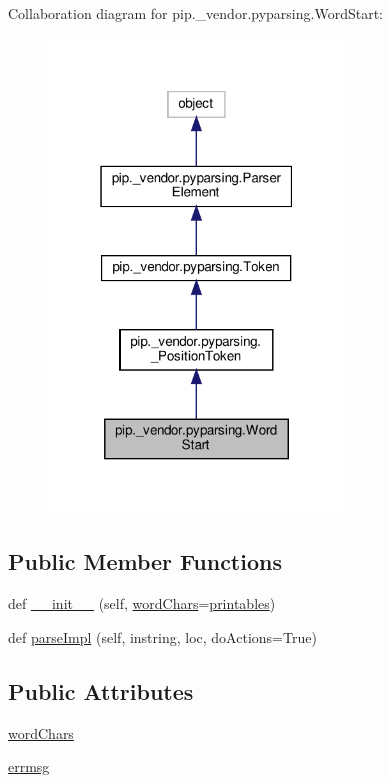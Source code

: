 Collaboration diagram for pip.\+\_\+vendor.\+pyparsing.\+Word\+Start\+:
\nopagebreak
\begin{figure}[H]
\begin{center}
\leavevmode
\includegraphics[width=223pt]{classpip_1_1__vendor_1_1pyparsing_1_1WordStart__coll__graph}
\end{center}
\end{figure}
\subsection*{Public Member Functions}
\begin{DoxyCompactItemize}
\item 
def \hyperlink{classpip_1_1__vendor_1_1pyparsing_1_1WordStart_a703c0be0af0ace588d77d91f25e23092}{\+\_\+\+\_\+init\+\_\+\+\_\+} (self, \hyperlink{classpip_1_1__vendor_1_1pyparsing_1_1WordStart_ae133aef6271fe43321ef7c85f2a02aef}{word\+Chars}=\hyperlink{namespacepip_1_1__vendor_1_1pyparsing_ac9075b160f22a7b6557fff8c2fb1f329}{printables})
\item 
def \hyperlink{classpip_1_1__vendor_1_1pyparsing_1_1WordStart_af40797b120d256528b354cd3d425d290}{parse\+Impl} (self, instring, loc, do\+Actions=True)
\end{DoxyCompactItemize}
\subsection*{Public Attributes}
\begin{DoxyCompactItemize}
\item 
\hyperlink{classpip_1_1__vendor_1_1pyparsing_1_1WordStart_ae133aef6271fe43321ef7c85f2a02aef}{word\+Chars}
\item 
\hyperlink{classpip_1_1__vendor_1_1pyparsing_1_1WordStart_aea73b1815e1b5025b7ddf06592edc2b7}{errmsg}
\end{DoxyCompactItemize}
